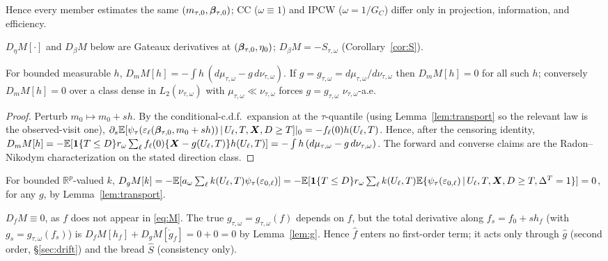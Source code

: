 \noindent Hence every member estimates the same $(m_{\tau,0},\bm{\beta}_{\tau,0})$;
CC ($\omega\equiv1$) and IPCW ($\omega=1/G_C$) differ only in projection,
information, and efficiency.

$D_\eta M[\cdot]$ and $D_\beta M$ below are Gateaux derivatives at
$(\bm{\beta}_{\tau,0},\eta_0)$; $D_\beta M=-S_{\tau,\omega}$ (Corollary~\ref{cor:S}).

\begin{lemma}\label{lem:m}
For bounded measurable $h$, $D_mM[h]=-\int h\,(d\mu_{\tau,\omega}-g\,
d\nu_{\tau,\omega})$. If $g=g_{\tau,\omega}=d\mu_{\tau,\omega}/d\nu_{\tau,\omega}$
then $D_mM[h]=0$ for all such $h$; conversely $D_mM[h]=0$ over a class dense in
$L_2(\nu_{\tau,\omega})$ with $\mu_{\tau,\omega}\ll\nu_{\tau,\omega}$ forces
$g=g_{\tau,\omega}$ $\nu_{\tau,\omega}$-a.e.
\end{lemma}
\begin{proof}
Perturb $m_0\mapsto m_0+sh$. By the conditional-c.d.f.\ expansion at the
$\tau$-quantile (using Lemma~\ref{lem:transport} so the relevant law is the
observed-visit one), $\partial_s\mathbb{E}[\psi_\tau(\varepsilon_\ell(\bm{\beta}_{\tau,0},
m_0+sh))\,\vert\, U_\ell,T,\bm{X},D\ge T]|_0=-f_\ell(0)h(U_\ell,T)$. Hence, after the
censoring identity,
$D_mM[h]=-\mathbb{E}[\mathbf{1}\{T\le D\}r_{\omega}\sum_\ell f_\ell(0)\{\bm{X}-g(U_\ell,T)\}h(U_\ell,T)]
=-\int h\,(d\mu_{\tau,\omega}-g\,d\nu_{\tau,\omega})$. The forward and converse
claims are the Radon--Nikodym characterization on the stated direction class.
\end{proof}

\begin{lemma}\label{lem:g}
For bounded $\mathbb R^p$-valued $k$,
$D_gM[k]=-\mathbb{E}[a_\omega\sum_\ell k(U_\ell,T)\psi_\tau(\varepsilon_{0,\ell})]
=-\mathbb{E}[\mathbf{1}\{T\le D\}r_{\omega}\sum_\ell k(U_\ell,T)\mathbb{E}\{\psi_\tau(\varepsilon_{0,\ell})
\,\vert\, U_\ell,T,\bm{X},D\ge T,\Delta^T=1\}]=0$, for any $g$, by Lemma~\ref{lem:transport}.
\end{lemma}

\begin{lemma}\label{lem:f}
$D_fM\equiv0$, as $f$ does not appear in \eqref{eq:M}. The true
$g_{\tau,\omega}=g_{\tau,\omega}(f)$ depends on $f$, but the total derivative
along $f_s=f_0+sh_f$ (with $g_s=g_{\tau,\omega}(f_s)$) is
$D_fM[h_f]+D_gM[\dot g_f]=0+0=0$ by Lemma~\ref{lem:g}. Hence $\widehat f$ enters
no first-order term; it acts only through $\widehat g$ (second order,
\S\ref{sec:drift}) and the bread $\widehat S$ (consistency only).
\end{lemma}

